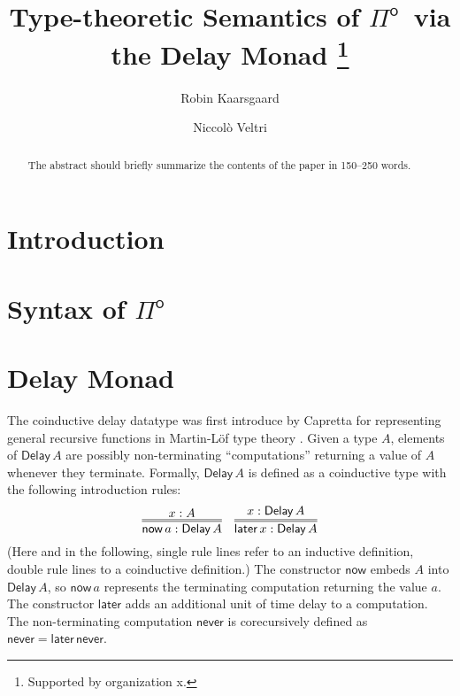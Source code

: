 \documentclass[runningheads]{llncs}
\newcommand{\Pio}{$\Pi^{\mathsf{o}}$}
\newcommand{\Delay}{\mathsf{Delay}\,}
\newcommand{\now}{\mathsf{now}}
\newcommand{\later}{\mathsf{later}}
\newcommand{\never}{\mathsf{never}}
\begin{document}
%
\title{Type-theoretic Semantics of \Pio\ via the Delay Monad \thanks{Supported by organization x.}}
%
%
\author{Robin Kaarsgaard  \and
Niccol\`o Veltri}
%
%
%
\maketitle              %
%
\begin{abstract}
The abstract should briefly summarize the contents of the paper in
150--250 words.

\end{abstract}

\section{Introduction}\label{sec:intro}

\section{Syntax of \Pio}\label{sec:syntax}

\section{Delay Monad}\label{sec:delay}

The coinductive delay datatype was first introduce by Capretta for
representing general recursive functions in Martin-L\"of type theory
\cite{Capretta05}.  Given a type $A$, elements of $\Delay A$ are
possibly non-terminating ``computations'' returning a value of $A$
whenever they terminate. Formally, $\Delay A$ is defined as a
coinductive type with the following introduction rules:
\[
\infer={\now\,a : \Delay A}{x : A}
\quad
\infer={\later\,x : \Delay A}{x : \Delay A}
\]
(Here and in the following, single rule lines refer to an inductive
definition, double rule lines to a coinductive definition.) The
constructor $\now$ embeds $A$ into $\Delay A$, so $\now\,a$ represents
the terminating computation returning the value $a$. The constructor
$\later$ adds an additional unit of time delay to a computation. The
non-terminating computation $\never$ is corecursively defined as
$\never = \later \,\never$.
\end{document}
